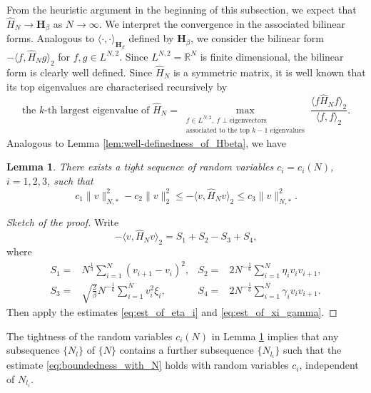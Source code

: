 \documentclass[11pt, a4paper]{article}
\numberwithin{equation}{section}
\newcommand{\realR}{\mathbb{R}}
\newcommand{\Hbeta}{\mathbf{H}_{\beta}}
\newtheorem{lem}{Lemma}
\theoremstyle{definition}
\theoremstyle{remark}
\begin{document}
From the heuristic argument in the beginning of this subsection, we expect that $\hat{H}_N \to \Hbeta$ as $N \to \infty$. We interpret the convergence in the associated bilinear forms. Analogous to $\langle \cdot, \cdot \rangle_{\Hbeta}$ defined by $\Hbeta$, we consider the bilinear form $-\langle f, \hat{H}_N g \rangle_2$ for $f, g \in L^{N, 2}$. Since $L^{N, 2} = \realR^N$ is finite dimensional, the bilinear form is clearly well defined. Since $\hat{H}_N$ is a symmetric matrix, it is well known that its top eigenvalues are characterised recursively by
\begin{equation} \label{eq:variational_defn_of_top_eigen_of_H_N}
  \text{the $k$-th largest eigenvalue of $\hat{H}_N$} = \max_{\substack{f \in L^{N, 2},\ f \perp \text{eigenvectors} \\ \text{associated to the top $k - 1$ eigenvalues}}} \frac{\langle f \hat{H}_N f \rangle_2}{\langle f, f \rangle_2}.
\end{equation}
Analogous to Lemma \ref{lem:well-definedness_of_Hbeta}, we have
\begin{lem} \label{lem:boundedness_with_N}
  There exists a tight sequence of random variables $c_i = c_i(N)$, $i = 1, 2, 3$, such that
  \begin{equation} \label{eq:boundedness_with_N}
    c_1 \lVert v \rVert^2_{N, *} - c_2 \lVert v \rVert^2_2 \leq -\langle v, \hat{H}_N v \rangle_2 \leq c_3 \lVert v \rVert^2_{N, *}.
  \end{equation}
\end{lem}
\begin{proof}[Sketch of the proof]
  Write
  \begin{equation}
    -\langle v, \hat{H}_N v \rangle_2 = S_1 + S_2 - S_3 + S_4,
  \end{equation}
  where
  \begin{equation}
    \begin{aligned}
      S_1 = {}& N^{\frac{1}{3}} \sum^{N}_{i = 1} (v_{i + 1} - v_i)^2, & S_2 = {}& 2N^{-\frac{1}{6}} \sum^N_{i = 1} \eta_i v_i v_{i + 1}, \\
      S_3 = {}& \sqrt{\frac{2}{\beta}} N^{-\frac{1}{6}} \sum^N_{i = 1} v^2_i \xi_i, & S_4 = {}& 2N^{-\frac{1}{6}} \sum^N_{i = 1} \gamma_i v_i v_{i + 1}.
    \end{aligned}
  \end{equation}
  Then apply the estimates \eqref{eq:est_of_eta_i} and \eqref{eq:est_of_xi_gamma}.
\end{proof}

The tightness of the random variables $c_i(N)$ in Lemma \ref{lem:boundedness_with_N} implies that any subsequence $\{ N_l \}$ of $\{ N \}$ contains a further subsequence $\{ N_{l_i} \}$ such that the estimate \eqref{eq:boundedness_with_N} holds with random variables $c_i$, independent of $N_{l_i}$.
\end{document}
